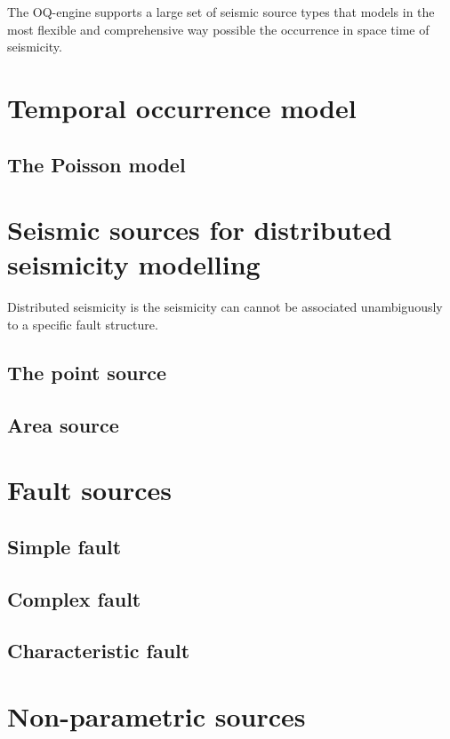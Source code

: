 The OQ-engine supports a large set of seismic source types that models in 
the most flexible and comprehensive way possible the occurrence in space 
time of seismicity.
%
\section{Temporal occurrence model}
\subsection{The Poisson model}
%
\section{Seismic sources for distributed seismicity modelling}
%
Distributed seismicity is the seismicity can cannot be associated unambiguously
to a specific fault structure.

\subsection{The point source}
%
\subsection{Area source}
%
\section{Fault sources}
%
\subsection{Simple fault}
%
\subsection{Complex fault}
%
\subsection{Characteristic fault}
%
\section{Non-parametric sources}
